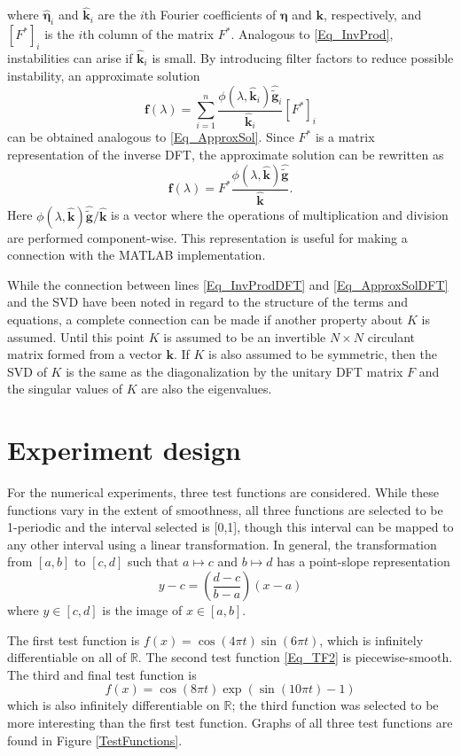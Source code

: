 \documentclass[12pt]{article}
\newcommand{\fcon}{f}
\newcommand{\gnoise}{\widetilde{\mathbf{g}}}
\newcommand{\kdis}{\mathbf{k}}
\newcommand{\kmat}{K}	%
\newcommand{\fdis}{\mathbf{f}}
\newcommand{\regparam}{\lambda}
\newcommand{\filt}{\phi}
\newcommand{\noise}{\bm{\eta}}	%
\begin{document}
where $\widehat{\noise}_i$ and $\widehat{\kdis}_i$ are the $i$th Fourier coefficients of $\noise$ and $\kdis$, respectively, and $[F^*]_i$ is the $i$th column of the matrix $F^*$. Analogous to \eqref{Eq_InvProd}, instabilities can arise if $\widehat{\kdis}_i$ is small. By introducing filter factors to reduce possible instability, an approximate solution
\begin{equation}
\fdis(\regparam) = \sum_{i = 1}^n \frac{\filt(\regparam,\widehat{\kdis}_i)\widehat{\gnoise}_i}{\widehat{\kdis}_i}[F^*]_i
\label{Eq_ApproxSolDFT}
\end{equation}
can be obtained analogous to \eqref{Eq_ApproxSol}. 
Since $F^*$ is a matrix representation of the inverse DFT, the approximate solution can be rewritten as
\[\fdis(\regparam) = F^* \frac{\filt(\regparam,\widehat{\kdis})\widehat{\gnoise}}{\widehat{\kdis}}.\]
Here $\filt(\regparam,\widehat{\kdis})\widehat{\gnoise}/{\widehat{\kdis}}$ is a vector where the operations of multiplication and division are performed component-wise. This representation is useful for making a connection with the MATLAB implementation. \par 
While the connection between lines \eqref{Eq_InvProdDFT} and \eqref{Eq_ApproxSolDFT} and the SVD have been noted in regard to the structure of the terms and equations, a complete connection can be made if another property about $\kmat$ is assumed. Until this point $\kmat$ is assumed to be an invertible $N \times N$ circulant matrix formed from a vector $\kdis$. If $\kmat$ is also assumed to be symmetric, then the SVD of $\kmat$ is the same as the diagonalization by the unitary DFT matrix $F$ and the singular values of $\kmat$ are also the eigenvalues. 

\section{Experiment design} \label{Experiment design}

For the numerical experiments, three test functions are considered. While these functions vary in the extent of smoothness, all three functions are selected to be 1-periodic and the interval selected is [0,1], though this interval can be mapped to any other interval using a linear transformation. In general, the transformation from $[a,b]$ to $[c,d]$ such that $a \mapsto c$ and $b \mapsto d$ has a point-slope representation
\[y - c = \left(\frac{d-c}{b-a}\right)(x - a)\]
where $y \in [c,d]$ is the image of $x \in [a,b]$. \par
The first test function is $\fcon(x) = \cos(4\pi{t})\sin(6\pi{t})$, which is infinitely differentiable on all of $\mathbb{R}$. The second test function \eqref{Eq_TF2} is piecewise-smooth. The third and final test function is
\begin{equation}
\fcon(x) = \cos(8\pi{t})\exp(\sin(10\pi{t})-1)
\label{Eq_TF3}
\end{equation}
which is also infinitely differentiable on $\mathbb{R}$; the third function was selected to be more interesting than the first test function. Graphs of all three test functions are found in Figure \ref{TestFunctions}.  \par
\end{document}
